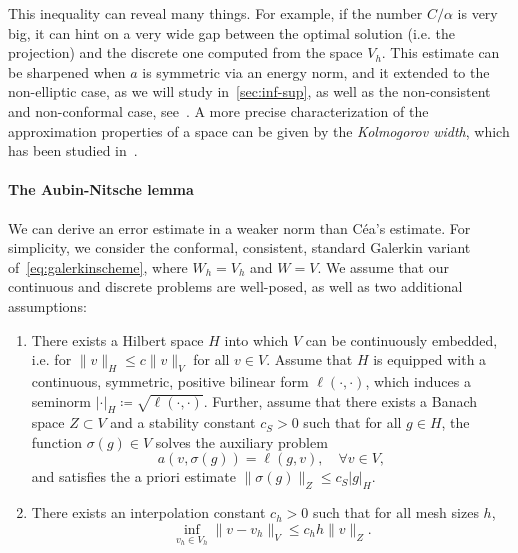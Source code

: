 This inequality can reveal many things. For example, if the number $C/\alpha$ is very big, it can hint on a very wide gap between the optimal solution (i.e. the projection) and the discrete one computed from the space $V_h$. This estimate can be sharpened when $a$ is symmetric via an energy norm, and it extended to the non-elliptic case, as we will study in~\ref{sec:inf-sup}, as well as the non-consistent and non-conformal case, see~\cite[Sect. 2.3.2]{ern2004theory}. A more precise characterization of the approximation properties of a space can be given by the \emph{Kolmogorov width}, which has been studied in~\cite{evans2009n}.

\paragraph{The Aubin-Nitsche lemma} We can derive an error estimate in a weaker norm than Céa's estimate. For simplicity, we consider the conformal, consistent, standard Galerkin variant of~\ref{eq:galerkinscheme}, where $W_h=V_h$ and $W=V$. We assume that our continuous and discrete problems are well-posed, as well as two additional assumptions: 
\begin{enumerate}
    \item There exists a Hilbert space $H$ into which $V$ can be continuously embedded, i.e. for $\|v\|_H \leq c\|v\|_V$ for all $v\in V$. Assume that $H$ is equipped with a continuous, symmetric, positive bilinear form $\ell(\cdot,\cdot)$, which induces a seminorm $|\cdot|_H \coloneqq\sqrt{\ell(\cdot,\cdot)}$. Further, assume that there exists a Banach space $Z\subset V$ and a stability constant $c_S>0$ such that for all $g\in H$, the function $\sigma(g)\in V$ solves the auxiliary problem
    \begin{equation*}
        a(v, \sigma(g)) = \ell(g, v),\quad \forall v\in V,
    \end{equation*}
    and satisfies the a priori estimate $\|\sigma(g)\|_Z \leq c_S |g|_H$.
    \item There exists an interpolation constant $c_h>0$ such that for all mesh sizes $h$, 
    \begin{equation*}
        \inf_{v_h\in V_h} \|v-v_h\|_V \leq c_h h \|v\|_Z.
    \end{equation*}
\end{enumerate}

